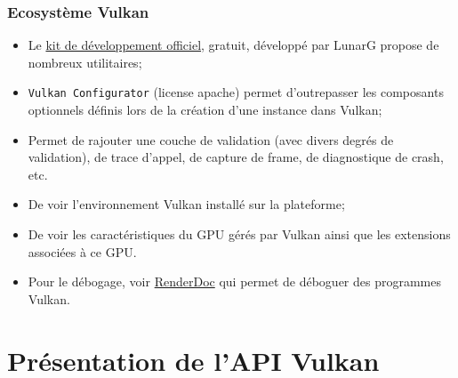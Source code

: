 \documentclass{beamer}
\begin{document}
\begin{frame}[fragile]
    \frametitle{Ecosystème Vulkan}
    
    \begin{itemize}
    \item Le \href{https://www.lunarg.com/vulkan-sdk}{kit de développement officiel}, gratuit, développé par LunarG propose de nombreux utilitaires;
    \item \texttt{Vulkan Configurator} (license apache) permet d'outrepasser les composants optionnels définis lors de la création d'une instance dans Vulkan;
    \item Permet de rajouter une couche de validation (avec divers degrés de validation), de trace d'appel, de capture de frame, de diagnostique de crash, etc.
    \item De voir l'environnement Vulkan installé sur la plateforme;
    \item De voir les caractéristiques du GPU gérés par Vulkan ainsi que les extensions associées à ce GPU.
    \item Pour le débogage, voir \href{https://renderdoc.org/}{RenderDoc} qui permet de déboguer des programmes Vulkan.
    \end{itemize}
    
\end{frame}

\section{Présentation de l'API Vulkan}
\end{document}

